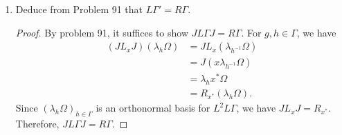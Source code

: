 \documentclass[a4paper,10pt]{report}
\DeclarePairedDelimiter{\set}{\{}{\}}
\begin{document}
\begin{enumerate}
\begin{enumerate}
\begin{proof}
					Let $x \in L\Gamma$.
					By the definition of $L\Gamma$, there is a net $(x_i)_{i \in I}$
					so that $x_i \in \text{span}\set{\lambda_g : g \in \Gamma}$
					for each $i \in I$ and $x_i \to x$ SOT.
					By the Kaplansky density theorem,
					we may assume $\|x_i\| \le \|x\|$ for all $i \in I$.
					Then since multiplication is jointly continuous on bounded sets,
					$(x - x_i)^*(x - x_i) \to 0$ SOT.
					Therefore, $(x - x_i)^*(x - x_i) \to 0$ WOT and hence $\sigma$-WOT,
					since everything is bounded.
					Now since $\tr$ is $\sigma$-WOT continuous,
					$$\|x\Omega - x_i\Omega\|_2^2 = \tr((x - x_i)^*(x - x_i)) \to \tr(0) = 0.$$
					That is, $x_i\Omega \to x\Omega$ in $L^2L\Gamma$.
					This completes the proof that $(\lambda_g)_{g \in \Gamma}$
					is an orthonormal basis for $L^2L\Gamma$.
					
					Now for all $g, h \in \Gamma$,
					\begin{align*}
						L_{\lambda_g}u\delta_h
						& = L_{\lambda_g}\lambda_h\Omega \\
						& = \lambda_g\lambda_h\Omega \\
						& = \lambda_{gh}\Omega \\
						& = u\delta_{gh} \\
						& = u\lambda_g\delta_h.
					\end{align*}
					Hence by linearity and continuity of $u$ and each $\lambda_g$, we have
					$L_xu\xi = ux\xi$ for all $\xi \in \ell^2\Gamma$ and all
					$x \in \text{span}\set{\lambda_g : g \in \Gamma}$.
					It remains to check that if $x_i \to x$ SOT, then $L_{x_i} \to L_x$ SOT.
					By the Kaplansky density theorem, we may assume $\|x_i\| \le \|x\|$ for all $i$.
					Then for $y \in L\Gamma$, we have $\|x_iy\| \le \|xy\|$ and $x_iy \to xy$ SOT.
					Hence, by the computation in the previous paragraph,
					$L_{x_i}(y\Omega) \to L_x(y\Omega)$ in $L^2L\Gamma$.
					Since this holds for all $y \in L\Gamma$, we have $L_{x_i} \to L_x$ SOT
					as desired.
				\end{proof}
			\item Deduce from Problem 91 that $L\Gamma' = R\Gamma$.
				\begin{proof}
					By problem 91, it suffices to show $J L\Gamma J = R\Gamma$.
					For $g, h \in \Gamma$, we have
					\begin{align*}
						(J L_x J) (\lambda_h\Omega)
						 & = J L_x (\lambda_{h^{-1}}\Omega) \\
						 & = J (x\lambda_{h^{-1}} \Omega) \\
						 & = \lambda_hx^* \Omega \\
						 & = R_{x^*}(\lambda_h \Omega).
					\end{align*}
					Since $(\lambda_h\Omega)_{h \in \Gamma}$ is an orthonormal basis for
					$L^2L\Gamma$, we have $JL_xJ = R_{x^*}$.
					Therefore, $J L\Gamma J = R\Gamma$.
				\end{proof}
		\end{enumerate}
\end{enumerate}
\end{document}
